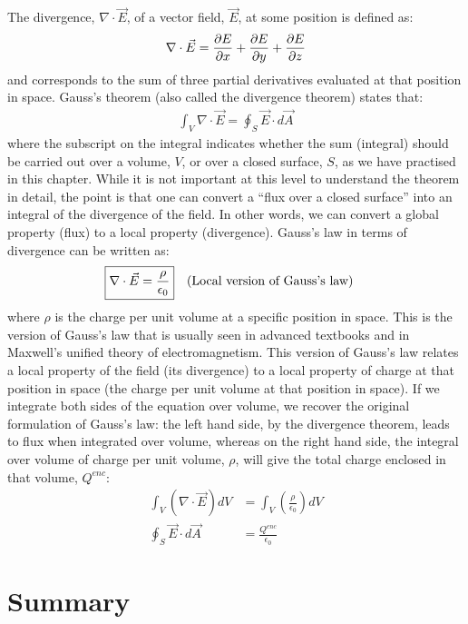 The divergence, $\nabla \cdot \vec E$, of a vector field, $\vec E$, at some position is defined as:
\begin{align*}
\nabla \cdot \vec E=\frac{\partial E}{\partial x}+\frac{\partial E}{\partial y}+\frac{\partial E}{\partial z}
\end{align*}
and corresponds to the sum of three partial derivatives evaluated at that position in space. Gauss's theorem (also called the divergence theorem) states that:
\begin{align*}
\int_V \nabla \cdot \vec E = \oint_S \vec E \cdot d\vec A
\end{align*}
where the subscript on the integral indicates whether the sum (integral) should be carried out over a volume, $V$, or over a closed surface, $S$, as we have practised in this chapter. While it is not important at this level to understand the theorem in detail, the point is that one can convert a ``flux over a closed surface'' into an integral of the divergence of the field. In other words, we can convert a global property (flux) to a local property (divergence). Gauss's law in terms of divergence can be written as:
\begin{align*}
\Aboxed{\nabla \cdot \vec E &= \frac{\rho}{\epsilon_0}}\quad \text{(Local version of Gauss's law)}
\end{align*}
where $\rho$ is the charge per unit volume at a specific position in space. This is the version of Gauss's law that is usually seen in advanced textbooks and in Maxwell's unified theory of electromagnetism. This version of Gauss's law relates a local property of the field (its divergence) to a local property of charge at that position in space (the charge per unit volume at that position in space). If we integrate both sides of the equation over volume, we recover the original formulation of Gauss's law: the left hand side, by the divergence theorem, leads to flux when integrated over volume, whereas on the right hand side, the integral over volume of charge per unit volume, $\rho$, will give the total charge enclosed in that volume, $Q^{enc}$:
\begin{align*}
\int_V  \left(\nabla \cdot \vec E \right)dV&= \int_V \left(\frac{\rho}{\epsilon_0}\right) dV\\
\oint_S \vec E \cdot d\vec A &=\frac{Q^{enc}}{\epsilon_0}
\end{align*}

\newpage
\section{Summary}

